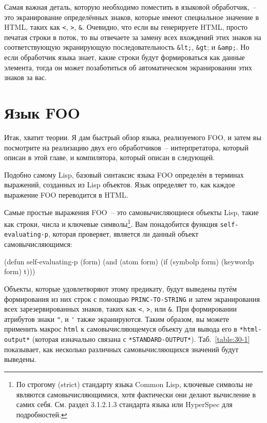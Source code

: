 Самая важная деталь, которую необходимо поместить в языковой обработчик,~-- это
экранирование определённых знаков, которые имеют специальное значение в HTML, таких как
\lstinline{<}, \lstinline{>}, \lstinline!&!. Очевидно, что если вы генерируете HTML, просто печатая
строки в поток, то вы отвечаете за замену всех вхождений этих знаков на соответствующую
экранирующую последовательность \lstinline!&lt;!, \lstinline!&gt!; и \lstinline!&amp;!. Но
если обработчик языка знает, какие строки будут формироваться как данные элемента, тогда
он может позаботиться об автоматическом экранировании этих знаков за вас.

\section{Язык FOO}

Итак, хватит теории. Я дам быстрый обзор языка, реализуемого FOO, и затем вы посмотрите на
реализацию двух его обработчиков~-- интерпретатора, который описан в этой главе, и
компилятора, который описан в следующей.

Подобно самому Lisp, базовый синтаксис языка FOO определён в терминах выражений, созданных
из Lisp объектов. Язык определяет то, как каждое выражение FOO переводится в HTML.

Самые простые выражения FOO~-- это самовычисляющиеся объекты Lisp, такие как строки,
числа и ключевые символы\footnote{По строгому (strict) стандарту языка Common Lisp,
  ключевые символы не являются самовычисляющимися, хотя фактически они делают
  вычисление в самих себя. См. раздел 3.1.2.1.3 стандарта языка или HyperSpec для
  подробностей.}. Вам понадобится функция \lstinline{self-evaluating-p}, которая проверяет,
является ли данный объект самовычисляющимся:

\begin{myverb}
(defun self-evaluating-p (form)
  (and (atom form) (if (symbolp form) (keywordp form) t)))
\end{myverb}

Объекты, которые удовлетворяют этому предикату, будут выведены путём формирования из них
строк с помощью \lstinline{PRINC-TO-STRING} и затем экранирования всех зарезервированных
знаков, таких как \lstinline{<}, \lstinline{>}, или \lstinline!&!. При формировании атрибутов знаки
\lstinline!"!, и \lstinline!'! также экранируются. Таким образом, вы можете применить
макрос \lstinline{html} к самовычисляющемуся объекту для вывода его в
\lstinline{*html-output*} (которая изначально связана с
\lstinline{*STANDARD-OUTPUT*}). Таб.~\ref{table:30-1} показывает, как несколько различных
самовычисляющихся значений будут выведены.

